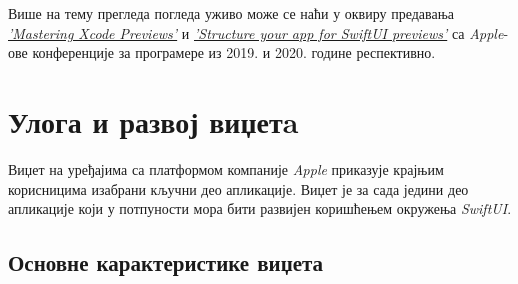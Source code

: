 \documentclass[12pt,oneside]{memoir}
\begin{document}
\indent Више на тему прегледа погледа уживо може се наћи у оквиру предавања \href{https://developer.apple.com/videos/play/wwdc2019/233/}{\textit{'Mastering Xcode Previews'}} \cite{Mastering_Xcode_Previews} и \href{https://developer.apple.com/videos/play/wwdc2020/10149/}{\textit{'Structure your app for SwiftUI previews'}} \cite{Structure_your_app_for_SwiftUI_previews} са \textit{Apple}-ове конференције за програмере из 2019. и 2020. године респективно.

\chapter{Улога и развој виџетa}

\indent Виџет на уређајима са платформом компаније \textit{Apple} приказује крајњим корисницима изабрани кључни део апликације. Виџет је за сада једини део апликације који у потпуности мора бити развијен коришћењем окружења \textit{SwiftUI}.

\section{Основне карактеристике виџета}
\end{document}
